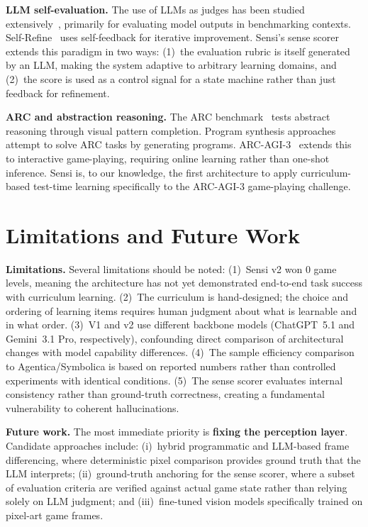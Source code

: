 \documentclass[11pt,letterpaper]{article}
\begin{document}
\textbf{LLM self-evaluation.} The use of LLMs as judges has been studied extensively~\citep{zheng2024judging}, primarily for evaluating model outputs in benchmarking contexts. Self-Refine~\citep{madaan2024selfrefine} uses self-feedback for iterative improvement. Sensi's sense scorer extends this paradigm in two ways: (1)~the evaluation rubric is itself generated by an LLM, making the system adaptive to arbitrary learning domains, and (2)~the score is used as a control signal for a state machine rather than just feedback for refinement.

\textbf{ARC and abstraction reasoning.} The ARC benchmark~\citep{chollet2019measure} tests abstract reasoning through visual pattern completion. Program synthesis approaches~\citep{johnson2021program} attempt to solve ARC tasks by generating programs. ARC-AGI-3~\citep{arcprize2024arcagi} extends this to interactive game-playing, requiring online learning rather than one-shot inference. Sensi is, to our knowledge, the first architecture to apply curriculum-based test-time learning specifically to the ARC-AGI-3 game-playing challenge.


\section{Limitations and Future Work}
\label{sec:limitations}

\textbf{Limitations.} Several limitations should be noted: (1)~Sensi v2 won 0 game levels, meaning the architecture has not yet demonstrated end-to-end task success with curriculum learning. (2)~The curriculum is hand-designed; the choice and ordering of learning items requires human judgment about what is learnable and in what order. (3)~V1 and v2 use different backbone models (ChatGPT~5.1 and Gemini~3.1 Pro, respectively), confounding direct comparison of architectural changes with model capability differences. (4)~The sample efficiency comparison to Agentica/Symbolica is based on reported numbers rather than controlled experiments with identical conditions. (5)~The sense scorer evaluates internal consistency rather than ground-truth correctness, creating a fundamental vulnerability to coherent hallucinations.

\textbf{Future work.} The most immediate priority is \textbf{fixing the perception layer}. Candidate approaches include: (i)~hybrid programmatic and LLM-based frame differencing, where deterministic pixel comparison provides ground truth that the LLM interprets; (ii)~ground-truth anchoring for the sense scorer, where a subset of evaluation criteria are verified against actual game state rather than relying solely on LLM judgment; and (iii)~fine-tuned vision models specifically trained on pixel-art game frames.
\end{document}
